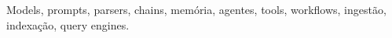 
Models, prompts, parsers, chains, memória, agentes, tools, workflows, ingestão, indexação, query engines.

